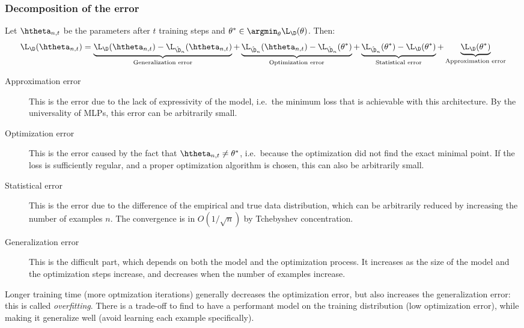 \subsubsection{Decomposition of the error}
\begin{property}
    Let $\htheta_{n,t}$ be the parameters after $t$ training steps and $\theta^*\in\argmin_\theta\L_\D(\theta)$. Then:
    \begin{equation*}
        \L_\D(\htheta_{n,t})=
        \underbrace{\L_\D(\htheta_{n,t}) - \L_{\hat{\D}_n}(\htheta_{n,t})}_{\textnormal{Generalization error}}
        + \underbrace{\L_{\hat{\D}_n}(\htheta_{n,t}) - \L_{\hat{\D}_n}(\theta^*)}_{\textnormal{Optimization error}} 
        + \underbrace{\L_{\hat{\D}_n}(\theta^*) - \L_\D(\theta^*)}_{\textnormal{Statistical error}}
        + \underbrace{\L_\D(\theta^*)}_{\textnormal{Approximation error}}
    \end{equation*}    
\end{property}
\begin{description}
    \item[Approximation error] This is the error due to the lack of expressivity of the model, i.e.~the minimum loss that is achievable with this architecture. By the universality of MLPs, this error can be arbitrarily small.
    \item[Optimization error] This is the error caused by the fact that $\htheta_{n,t}\neq\theta^*$, i.e.~because the optimization did not find the exact minimal point. If the loss is sufficiently regular, and a proper optimization algorithm is chosen, this can also be arbitrarily small.
    \item[Statistical error] This is the error due to the difference of the empirical and true data distribution, which can be arbitrarily reduced by increasing the number of examples $n$. The convergence is in $O(1/\sqrt{n})$ by Tchebyshev concentration.
    \item[Generalization error] This is the difficult part, which depends on both the model and the optimization process. It increases as the size of the model and the optimization steps increase, and decreases when the number of examples increase.
\end{description}

Longer training time (more optmization iterations) generally decreases the optimization error, but also increases the generalization error: this is called \emph{overfitting}. There is a trade-off to find to have a performant model on the training distribution (low optimization error), while making it generalize well (avoid learning each example specifically).

